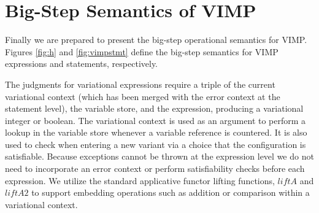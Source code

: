 \documentclass[12pt,oneside]{book}
\newcommand{\tagtree}[3]{#1 \langle #2, #3 \rangle}
\begin{document}
\section{Big-Step Semantics of VIMP}
\label{sec:bigvimp}

Finally we are prepared to present the big-step operational semantics for VIMP. Figures \ref{fig:h} and \ref{fig:vimpstmt} define the big-step semantics for VIMP expressions and
statements, respectively.

The judgments for variational expressions require a triple of the current variational context (which has been merged with the error context at the statement level), the variable store, and the expression, producing a variational integer or boolean.
The variational context is used as an argument to perform a lookup in the variable store whenever a variable reference is countered. It is also used to check when entering
a new variant via a choice that the configuration is satisfiable. Because exceptions cannot be thrown at the expression level we do not need to incorporate an error context or
perform satisfiability checks before each expression. We utilize the standard applicative functor lifting functions, $\mathit{liftA}$ and $\mathit{liftA2}$ to support embedding
operations such as addition or comparison within a variational context.

\def \BigVNum {\infer [VA-Num] { } {(C,S,n) \Downarrow_{VA} n}}
\def \BigVRef {\infer [VA-Ref] { } {(C,S,x) \Downarrow_{VA} S(C,x)}}
\def \BigVAdd {\infer [VA-Add] {(C,S,e) \Downarrow_{VA} \bar{n} \\ (C,S,e') \Downarrow_{VA} \bar{n}'} {(C,S,e+e') \Downarrow_{VA} \mathit{liftA2}(+,\bar{n},\bar{n}')}}
\def \BigVAChcOne {\infer [VA-Chc1] {\mathit{sat}(C \wedge C') \\ \mathit{sat}(C \wedge \neg C') \\ (C \wedge C',S,a) \Downarrow_{VA} \bar{n} \\ (C \wedge \neg C',S,a') \Downarrow_{VA} \bar{n}'} {(C,S,\tagtree{C'}{a}{a'}) \Downarrow_{VA} \tagtree{C'}{\bar{n}}{\bar{n}'}}}
\def \BigVAChcTwo {\infer [VA-Chc2] {\mathit{unsat}(C \wedge C') \\ \mathit{sat}(C \wedge \neg C') \\ (C \wedge \neg C',S,a') \Downarrow_{VA} \bar{n}} {(C,S,\tagtree{A}{a}{a'}) \Downarrow_{VA} \bar{n}}}
\def \BigVAChcThree {\infer [VA-Chc3] {\mathit{sat}(C \wedge C') \\ \mathit{unsat}(C \wedge \neg C') \\ (C \wedge C',S,a) \Downarrow_{VA} \bar{n}} {(C,S,\tagtree{C'}{a}{a'}) \Downarrow_{VA} \bar{n}}}
\end{document}
